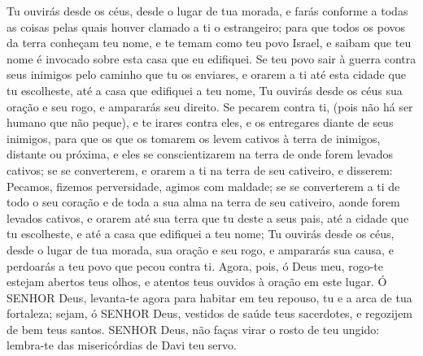 {Tu ouvirás desde os céus, desde o lugar de tua morada, e farás conforme a todas as coisas pelas quais houver clamado a ti o estrangeiro; para que todos os povos da terra conheçam teu nome, e te temam como teu povo Israel, e saibam que teu nome é invocado sobre esta casa que eu edifiquei.
Se teu povo sair à guerra contra seus inimigos pelo caminho que tu os enviares, e orarem a ti até esta cidade que tu escolheste, até a casa que edifiquei a teu nome,
Tu ouvirás desde os céus sua oração e seu rogo, e ampararás seu direito.
Se pecarem contra ti, (pois não há ser humano que não peque), e te irares contra eles, e os entregares diante de seus inimigos, para que os que os tomarem os levem cativos à terra de inimigos, distante ou próxima,
e eles se conscientizarem
 na terra de onde forem levados cativos; se se converterem, e orarem a ti na terra de seu cativeiro, e disserem: Pecamos, fizemos perversidade, agimos com maldade;
se se converterem a ti de todo o seu coração e de toda a sua alma na terra de seu cativeiro, aonde forem levados cativos, e orarem até sua terra que tu deste a seus pais, até a cidade que tu escolheste, e até a casa que edifiquei a teu nome;
Tu ouvirás desde os céus, desde o lugar de tua morada, sua oração e seu rogo, e ampararás sua causa, e perdoarás a teu povo que pecou contra ti.
Agora, pois, ó Deus meu, rogo-te estejam abertos teus olhos, e atentos teus ouvidos à oração em este lugar.
Ó SENHOR Deus, levanta-te agora para habitar em teu repouso, tu e a arca de tua fortaleza; sejam, ó SENHOR Deus, vestidos de saúde teus sacerdotes, e regozijem de bem teus santos.
SENHOR Deus, não faças virar o rosto de teu ungido: lembra-te das misericórdias de Davi teu servo.

}
